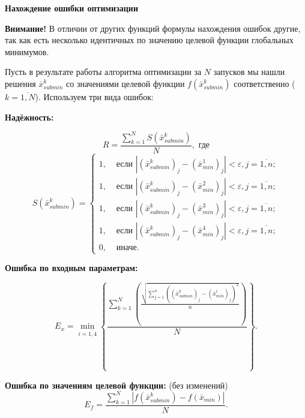 \textbf {Нахождение ошибки оптимизации}

{\color{red} \textbf{Внимание!} В отличии от других функций формулы нахождения ошибок другие, так как есть несколько идентичных по значению целевой функции глобальных минимумов.}

Пусть в результате работы алгоритма оптимизации за $N$ запусков мы нашли решения $\bar{x}_{submin}^k$ со значениями целевой функции $f\left( \bar{x}_{submin}^k\right) $ соответственно ($k=\overline{1,N}$). Используем три вида ошибок:

\textbf{Надёжность: }

\begin{equation*}
R = \dfrac{\sum_{k=1}^{N}S\left( \bar{x}_{submin}^k \right) }{N}, \text{ где}
\end{equation*}
\begin{equation*}
S\left( \bar{x}_{submin}^k \right)=\left\lbrace \begin{aligned} 1,& \text{ если } \left| \left( \bar{x}_{submin}^k \right)_j-\left( \bar{x}_{min}^1 \right)_j\right|<\varepsilon, j=\overline{1,n};   \\ 1,& \text{ если } \left| \left( \bar{x}_{submin}^k \right)_j-\left( \bar{x}_{min}^2 \right)_j\right|<\varepsilon, j=\overline{1,n};   \\ 1,& \text{ если } \left| \left( \bar{x}_{submin}^k \right)_j-\left( \bar{x}_{min}^3 \right)_j\right|<\varepsilon, j=\overline{1,n};   \\ 1,& \text{ если } \left| \left( \bar{x}_{submin}^k \right)_j-\left( \bar{x}_{min}^4 \right)_j\right|<\varepsilon, j=\overline{1,n};   \\ 0,& \text{ иначе}. \end{aligned}\right.
\end{equation*}

\textbf{Ошибка по входным параметрам:}

\begin{equation*}
E_x = \min_{i=\overline{1,4}} \left\lbrace  \frac{\sum_{k=1}^{N} \left( \frac{\sqrt{\sum_{j=1}^{n}{\left( \left( \bar{x}_{submin}^k \right)_j-\left( \bar{x}_{min}^i \right)_j \right)}^2 }}{n} \right)  }{N}\right\rbrace  .
\end{equation*}

\textbf{Ошибка по значениям целевой функции: }
 (без изменений)
\begin{equation*}
E_f = \dfrac{\sum_{k=1}^{N} \left| f\left( \bar{x}_{submin}^k \right)-f\left( \bar{x}_{min} \right) \right|  }{N}.
\end{equation*}


